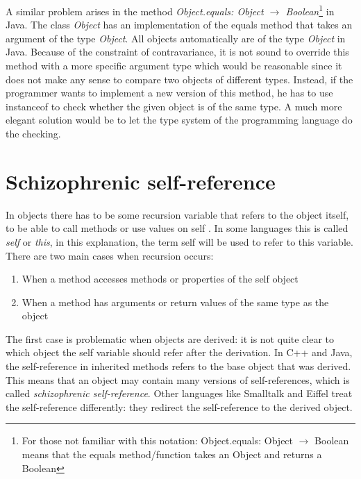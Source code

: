 A similar problem arises in the method \emph{Object.equals: Object
$\rightarrow$ Boolean}\footnote{For those not familiar with this
notation: Object.equals: Object $\rightarrow$ Boolean means that
the equals method/function takes an Object and returns a Boolean}
in Java. The class \emph{Object} has an implementation of the equals
method that takes an argument of the type \emph{Object}. All objects
automatically are of the type \emph{Object} in Java.	Because of the
constraint of contravariance, it is not sound to override this method
with a more specific argument type which would be reasonable since it does
not make any sense to compare two objects of different types. Instead,
if the programmer wants to implement a new version of this method, he
has to use instanceof to check whether the given object is of the same
type. A much more elegant solution would be to let the type system of
the programming language do the checking.\\

\section{Schizophrenic self-reference}
\label{sec:schizoReferences}

In objects there has to be some recursion variable that refers to the
object itself, to be able to call methods or use values on self . 
In some languages this is called \emph{self} or \emph{this}, in
this explanation, the term self will be used to refer to this variable. \\

There are two main cases when recursion occurs:
\begin{enumerate}
\item When a method accesses methods or properties of the self object
\item When a method has arguments or return values of the same type as the object
\end{enumerate}

The first case is problematic when objects are derived: it is not quite
clear to which object the self variable should refer after the derivation.
In C++ and Java, the self-reference in inherited methods refers to the
base object that was derived. This means that an object may contain
many versions of self-references, which is called \emph{schizophrenic
self-reference}. Other languages like Smalltalk and Eiffel treat the
self-reference differently: they redirect the self-reference to the
derived object. \\

